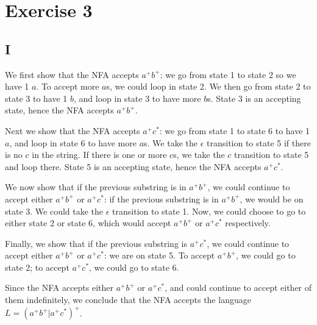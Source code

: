 \documentclass{article}
\begin{document}
\section*{Exercise 3}
\subsection*{I}
We first show that the NFA accepts $a^+b^+$: we go from state 1
to state 2 so we have 1 $a$. To accept more
$a$s, we could loop in state 2. We then go from state 2 to
state 3 to have 1 $b$, and loop in state 3 to have more
$b$s. State 3 is an accepting state, hence the NFA accepts
$a^+b^+$.

Next we show that the NFA accepts $a^+c^*$: we go from state 1 to
state 6 to have 1 $a$, and loop in state 6 to have more
$a$s. We take the $\epsilon$ transition to state
5 if there is no $c$ in the string. If there is one or more
$c$s, we take the $c$ transition to state
5 and loop there. State 5 is an accepting state, hence the NFA accepts
$a^+c^*$.

We now show that if the previous substring is in $a^+b^+$, we
could continue to accept either $a^+b^+$ or
$a^+c^*$: if the previous substring is in $a^+b^+$,
we would be on state 3. We could take the $\epsilon$ transition to
state 1. Now, we could choose to go to either state 2 or state 6, which would
accept $a^+b^+$ or $a^+c^*$ respectively.

Finally, we show that if the previous substring is $a^+c^*$, we
could continue to accept either $a^+b^+$ or
$a^+c^*$: we are on state 5. To accept $a^+b^+$, we
could go to state 2; to accept $a^+c^*$, we could go to state 6.

Since the NFA accepts either $a^+b^+$ or $a^+c^*$,
and could continue to accept either of them indefinitely, we conclude that the
NFA accepts the language $L=(a^+b^+|a^+c^*)^+$.
\end{document}
